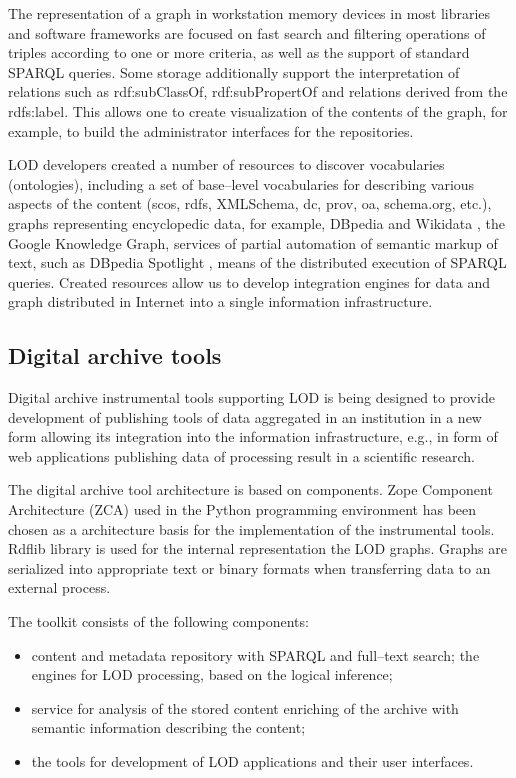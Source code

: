 \documentclass[conference,a4paper]{IEEEtran}
\begin{document}
The representation of a graph in workstation memory devices in most
libraries and software frameworks are focused on fast search and
filtering operations of triples according to one or more criteria, as
well as the support of standard SPARQL queries. Some storage
additionally support the interpretation of relations such as
rdf:subClassOf, rdf:subPropertOf and relations derived from the
rdfs:label. This allows one to create visualization of the contents of
the graph, for example, to build the administrator interfaces for the
repositories.

LOD developers created a number of resources to discover vocabularies
(ontologies), including a set of base--level vocabularies for describing
various aspects of the content (scos, rdfs, XMLSchema, dc, prov, oa,
schema.org, etc.), graphs representing encyclopedic data, for example,
DBpedia \cite{b3} and Wikidata \cite{b4}, the Google Knowledge Graph,
services of partial automation of semantic markup of text, such as
DBpedia Spotlight \cite{b5}, means of the distributed execution of SPARQL
queries. Created resources allow us to develop integration engines for
data and graph distributed in Internet into a single information
infrastructure.

\subsection{Digital archive tools}

Digital archive instrumental tools supporting LOD is being designed to
provide development of publishing tools of data aggregated in an
institution in a new form allowing its integration into the information
infrastructure, e.g., in form of web applications publishing data of
processing result in a scientific research.

The digital archive tool architecture is based on components. Zope
Component Architecture (ZCA) \cite{b6} used in the Python programming
environment \cite{b7} has been chosen as a architecture basis for the
implementation of the instrumental tools. Rdflib library is used for the
internal representation the LOD graphs. Graphs are serialized into
appropriate text or binary formats when transferring data to an external
process.

The toolkit consists of the following components:

\begin{itemize}
\item
  content and metadata repository with SPARQL and full--text search; the
  engines for LOD processing, based on the logical inference;
\item
  service for analysis of the stored content enriching of the archive
  with semantic information describing the content;
\item
  the tools for development of LOD applications and their user
  interfaces.
\end{itemize}
\end{document}
